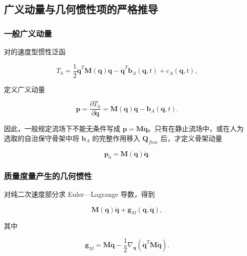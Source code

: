 \subsection{广义动量与几何惯性项的严格推导}\label{sec:galerkin-2-6}

\subsubsection{一般广义动量}\label{sec:galerkin-2-6-1}

对的速度型惯性泛函

\begin{equation}
\label{eq:galerkin-2-82}
T_{h} = \frac{1}{2}{\dot{\mathbf{q}}}^{T}\mathbf{M}\left( \mathbf{q} \right)\dot{\mathbf{q}} - {\dot{\mathbf{q}}}^{T}\mathbf{b}_{A}\left( \mathbf{q},t \right) + c_{A}\left( \mathbf{q},t \right),
\end{equation}

定义广义动量

\begin{equation}
\label{eq:galerkin-2-83}
\boxed{\mathbf{p} = \frac{\partial T_{h}}{\partial\dot{\mathbf{q}}} = \mathbf{M}\left( \mathbf{q} \right)\dot{\mathbf{q}} - \mathbf{b}_{A}\left( \mathbf{q},t \right).}
\end{equation}

因此，一般规定流场下不能无条件写成 \(\mathbf{p} = \mathbf{M}\dot{\mathbf{q}}\)。只有在静止流场中，或在人为选取的自治保守骨架中将 \(\mathbf{b}_{A}\) 的完整作用移入 \(\mathbf{Q}_{flow}\) 后，才定义骨架动量

\begin{equation}
\label{eq:galerkin-2-84}
\mathbf{p}_{0} = \mathbf{M}\left( \mathbf{q} \right)\dot{\mathbf{q}}.
\end{equation}

\subsubsection{质量度量产生的几何惯性}\label{sec:galerkin-2-6-2}

对纯二次速度部分求 Euler---Lagrange 导数，得到

\begin{equation}
\label{eq:galerkin-2-85}
\mathbf{M}\left( \mathbf{q} \right)\ddot{\mathbf{q}} + \mathbf{g}_{M}\left( \mathbf{q},\dot{\mathbf{q}} \right),
\end{equation}

其中

\begin{equation}
\label{eq:galerkin-2-86}
\boxed{\mathbf{g}_{M} = \dot{\mathbf{M}}\dot{\mathbf{q}} - \frac{1}{2}\nabla_{\mathbf{q}}\left( {\dot{\mathbf{q}}}^{T}\mathbf{M}\dot{\mathbf{q}} \right).}
\end{equation}


